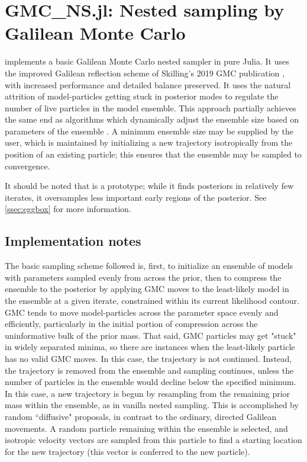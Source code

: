 \chapter{GMC\_NS.jl: Nested sampling by Galilean Monte Carlo}
\label{chap:GMC}
 implements a basic Galilean Monte Carlo nested sampler \cite{Skilling2012,Skilling2019} in pure Julia. It uses the improved Galilean reflection scheme of Skilling's 2019 GMC publication \cite{Skilling2019}, with increased performance and detailed balance preserved. It uses the natural attrition of model-particles getting stuck in posterior modes to regulate the number of live particles in the model ensemble. This approach partially achieves the same end as algorithms which dynamically adjust the ensemble size based on parameters of the ensemble \cite{Feroz2009,Higson2019}. A minimum ensemble size may be supplied by the user, which is maintained by initializing a new trajectory isotropically from the position of an existing particle; this ensures that the ensemble may be sampled to convergence.

It should be noted that  is a prototype; while it finds posteriors in relatively few iterates, it oversamples less important early regions of the posterior. See \autoref{ssec:eggbox} for more information.

\section{Implementation notes}

The basic sampling scheme followed is, first, to initialize an ensemble of models with parameters sampled evenly from across the prior, then to compress the ensemble to the posterior by applying GMC moves to the least-likely model in the ensemble at a given iterate, constrained within its current likelihood contour. GMC tends to move model-particles across the parameter space evenly and efficiently, particularly in the initial portion of compression across the uninformative bulk of the prior mass. That said, GMC particles may get "stuck" in widely separated minima, so there are instances when the least-likely particle has no valid GMC moves. In this case, the trajectory is not continued. Instead, the trajectory is removed from the ensemble and sampling continues, unless the number of particles in the ensemble would decline below the specified minimum. In this case, a new trajectory is begun by resampling from the remaining prior mass within the ensemble, as in vanilla nested sampling. This is accomplished by random ``diffusive" proposals, in contrast to the ordinary, directed Galilean movements. A random particle remaining within the ensemble is selected, and isotropic velocity vectors are sampled from this particle to find a starting location for the new trajectory (this vector is conferred to the new particle).


